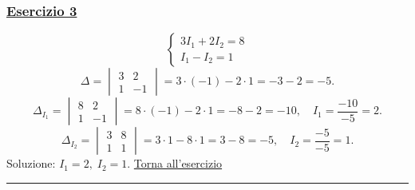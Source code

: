 \subsubsection*{\hyperref[ex:3]{Esercizio 3}}
\[
\begin{cases}
3I_1 + 2I_2 = 8 \\
I_1 - I_2 = 1
\end{cases}
\]
\[
\Delta = \begin{vmatrix} 3 & 2 \\ 1 & -1 \end{vmatrix} = 3\cdot(-1) - 2\cdot1 = -3-2 = -5.
\]
\[
\Delta_{I_1} = \begin{vmatrix} 8 & 2 \\ 1 & -1 \end{vmatrix} = 8\cdot(-1) - 2\cdot1 = -8-2 = -10,\quad I_1 = \frac{-10}{-5} = 2.
\]
\[
\Delta_{I_2} = \begin{vmatrix} 3 & 8 \\ 1 & 1 \end{vmatrix} = 3\cdot1 - 8\cdot1 = 3-8 = -5,\quad I_2 = \frac{-5}{-5} = 1.
\]
Soluzione: \(I_1 = 2,\; I_2 = 1\). \hfill \hyperlink{ex:3}{Torna all'esercizio}\\
\hrule

